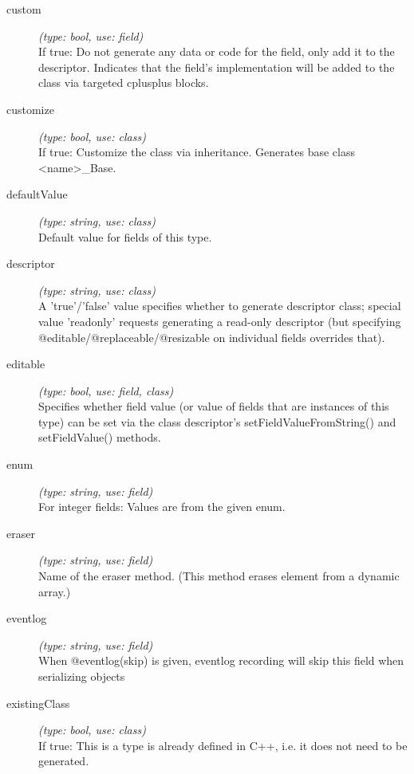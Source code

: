 \begin{description}
\item[custom] \textit{(type: bool, use: field)} \\
  If true: Do not generate any data or code for the field, only add it to the
  descriptor. Indicates that the field's implementation will be added to the
  class via targeted cplusplus blocks.

\item[customize] \textit{(type: bool, use: class)} \\
  If true: Customize the class via inheritance. Generates base class
  <name>\_Base.

\item[defaultValue] \textit{(type: string, use: class)} \\
  Default value for fields of this type.

\item[descriptor] \textit{(type: string, use: class)} \\
  A 'true'/'false' value specifies whether to generate descriptor class;
  special value 'readonly' requests generating a read-only descriptor (but
  specifying @editable/@replaceable/@resizable on individual fields overrides
  that).

\item[editable] \textit{(type: bool, use: field, class)} \\
  Specifies whether field value (or value of fields that are instances of this
  type) can be set via the class descriptor's setFieldValueFromString() and
  setFieldValue() methods.

\item[enum] \textit{(type: string, use: field)} \\
  For integer fields: Values are from the given enum.

\item[eraser] \textit{(type: string, use: field)} \\
  Name of the eraser method. (This method erases element from a dynamic
  array.)

\item[eventlog] \textit{(type: string, use: field)} \\
  When @eventlog(skip) is given, eventlog recording will skip this field when
  serializing objects

\item[existingClass] \textit{(type: bool, use: class)} \\
  If true: This is a type is already defined in C++, i.e. it does not need to
  be generated.


\end{description}
